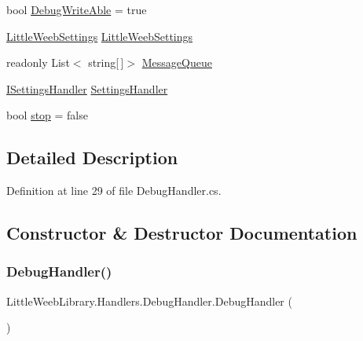 \begin{DoxyCompactItemize}
\item 
bool \mbox{\hyperlink{class_little_weeb_library_1_1_handlers_1_1_debug_handler_a37befa26f60bbf4a6b945fb8be13977e}{Debug\+Write\+Able}} = true
\item 
\mbox{\hyperlink{class_little_weeb_library_1_1_settings_1_1_little_weeb_settings}{Little\+Weeb\+Settings}} \mbox{\hyperlink{class_little_weeb_library_1_1_handlers_1_1_debug_handler_a6707530c5bad1e3a3af39620e0f783c2}{Little\+Weeb\+Settings}}
\item 
readonly List$<$ string\mbox{[}$\,$\mbox{]}$>$ \mbox{\hyperlink{class_little_weeb_library_1_1_handlers_1_1_debug_handler_af4dc20fe66b515bdd875bb4b1124cb2a}{Message\+Queue}}
\item 
\mbox{\hyperlink{interface_little_weeb_library_1_1_handlers_1_1_i_settings_handler}{I\+Settings\+Handler}} \mbox{\hyperlink{class_little_weeb_library_1_1_handlers_1_1_debug_handler_a6c33170a85d7efd28a204285e1851dc5}{Settings\+Handler}}
\item 
bool \mbox{\hyperlink{class_little_weeb_library_1_1_handlers_1_1_debug_handler_a56724baaa1b399d63773b3be73f0ad96}{stop}} = false
\end{DoxyCompactItemize}


\subsection{Detailed Description}


Definition at line 29 of file Debug\+Handler.\+cs.



\subsection{Constructor \& Destructor Documentation}
\mbox{\label{class_little_weeb_library_1_1_handlers_1_1_debug_handler_a110c2f11a80b5dfa28545eca4a867a0b}} 
\subsubsection{\texorpdfstring{Debug\+Handler()}{DebugHandler()}}
{\footnotesize\ttfamily Little\+Weeb\+Library.\+Handlers.\+Debug\+Handler.\+Debug\+Handler (\begin{DoxyParamCaption}{ }\end{DoxyParamCaption})}




